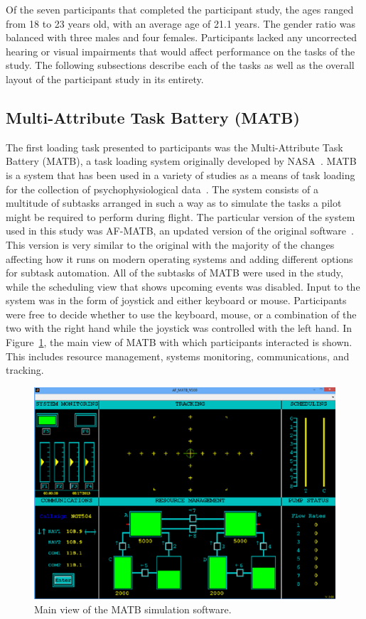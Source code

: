 \documentclass[11pt]{article}
\begin{document}
Of the seven participants that completed the participant study, the ages ranged from 18 to 23 years old, with an average age of 21.1 years. The gender ratio was balanced with three males and four females. Participants lacked any uncorrected hearing or visual impairments that would affect performance on the tasks of the study. 
The following subsections describe each of the tasks as well as the overall layout of the participant study in its entirety.
	
	\subsection{Multi-Attribute Task Battery (MATB)}
	The first loading task presented to participants was the Multi-Attribute Task Battery (MATB), a task loading system originally developed by NASA~\cite{Comstock}. MATB is a system that has been used in a variety of studies as a means of task loading for the collection of psychophysiological data~\cite{Wilson, Smith, Wang_Z}. The system consists of a multitude of subtasks arranged in such a way as to simulate the tasks a pilot might be required to perform during flight. The particular version of the system used in this study was AF-MATB, an updated version of the original software~\cite{Estepp}. This version is very similar to the original with the majority of the changes affecting how it runs on modern operating systems and adding different options for subtask automation. All of the subtasks of MATB were used in the study, while the scheduling view that shows upcoming events was disabled. Input to the system was in the form of joystick and either keyboard or mouse. Participants were free to decide whether to use the keyboard, mouse, or a combination of the two with the right hand while the joystick was controlled with the left hand. In Figure~\ref{fig:matb}, the main view of MATB with which participants interacted is shown. This includes resource management, systems monitoring, communications, and tracking. 
	
	\begin{figure}[]
	\centering
	\includegraphics[width=\linewidth]{figures/matb.png}
	\caption[Multi-Attribute Task Battery (MATB) Main View]{Main view of the MATB simulation software. }
	\label{fig:matb}
	\end{figure}
	
\end{document}

